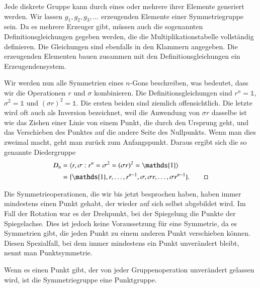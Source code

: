 \begin{definition}[Erzeugendensystem]
  Jede diskrete Gruppe kann durch eines oder mehrere ihrer Elemente generiert werden.
  Wir lassen \(g_1, g_2, g_3, \ldots\) erzeugenden Elemente einer Symmetriegruppe sein.
  Da es mehrere Erzeuger gibt, müssen auch die sogenannten Definitionsgleichungen gegeben werden, die die Multiplikationstabelle vollständig definieren.
  Die Gleichungen sind ebenfalls in den Klammern angegeben.
  Die erzeugenden Elementen bauen zusammen mit den Definitionsgleichungen ein Erzeugendensystem.
\end{definition}
\begin{beispiel}
  Wir werden nun alle Symmetrien eines \(n\)-Gons beschreiben, was bedeutet, dass wir die Operationen \(r\) und \(\sigma\) kombinieren.
  Die Definitionsgleichungen sind \(r^n = \mathds{1}\), \(\sigma^2 = \mathds{1}\) und \((\sigma r)^2 = \mathds{1}\).
  Die ersten beiden sind ziemlich offensichtlich.
  Die letzte wird oft auch als Inversion bezeichnet, weil die Anwendung von \(\sigma r\) dasselbe ist wie das Ziehen einer Linie von einem Punkt, die durch den Ursprung geht, und das Verschieben des Punktes auf die andere Seite des Nullpunkts.
  Wenn man dies zweimal macht, geht man zurück zum Anfangspunkt.
  Daraus ergibt sich die so genannte Diedergruppe 
  \begin{align*}
    D_n &= \langle r, \sigma : r^n = \sigma^2 = (\sigma r)^2 = \mathds{1} \rangle \\
      &= \{
          \mathds{1}, r, \ldots, r^{n-1}, \sigma, \sigma r, \ldots, \sigma r^{n-1}
      \}. \qedhere
  \end{align*}
\end{beispiel}

Die Symmetrieoperationen, die wir bis jetzt besprochen haben, haben immer mindestens einen Punkt gehabt, der wieder auf sich selbst abgebildet wird.
Im Fall der Rotation war es der Drehpunkt, bei der Spiegelung die Punkte der Spiegelachse.
Dies ist jedoch keine Voraussetzung für eine Symmetrie, da es Symmetrien gibt, die jeden Punkt zu einem anderen Punkt verschieben können.
 Diesen Spezialfall, bei dem immer mindestens ein Punkt unverändert bleibt, nennt man Punktsymmetrie.
\begin{definition}[Punktgruppe]
  Wenn es einen Punkt gibt, der von jeder Gruppenoperation unverändert gelassen wird, ist die Symmetriegruppe eine Punktgruppe.
\end{definition}

